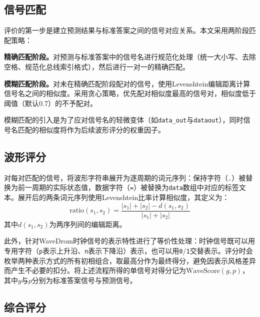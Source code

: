 \subsection{信号匹配}

评价的第一步是建立预测结果与标准答案之间的信号对应关系。本文采用两阶段匹配策略：

\textbf{精确匹配阶段。}对预测与标准答案中的信号名进行规范化处理（统一大小写、去除空格、规范化总线索引格式），然后进行一对一的精确匹配。

\textbf{模糊匹配阶段。}对未在精确匹配阶段配对的信号，使用Levenshtein编辑距离计算信号名之间的相似度。采用贪心策略，优先配对相似度最高的信号对，相似度低于阈值（默认0.7）的不予配对。

模糊匹配的引入是为了应对信号名的轻微变体（如\texttt{data\_out}与\texttt{dataout}），同时信号名匹配的相似度将作为后续波形评分的权重因子。

\subsection{波形评分}

对每对匹配的信号，将波形字符串展开为逐周期的词元序列：保持字符（\texttt{.}）被替换为前一周期的实际状态值，数据字符（\texttt{=}）被替换为\texttt{data}数组中对应的标签文本。展开后的两条词元序列使用Levenshtein比率计算相似度，其定义为：
\begin{equation}
  \text{ratio}(s_1, s_2) = \frac{|s_1| + |s_2| - d(s_1, s_2)}{|s_1| + |s_2|}
\end{equation}
其中$d(s_1, s_2)$为两序列间的编辑距离。


此外，针对WaveDrom时钟信号的表示特性进行了等价性处理：时钟信号既可以用专用字符（\texttt{p}表示上升沿、\texttt{n}表示下降沿）表示，也可以用\texttt{0}/\texttt{1}交替表示。评分时会枚举两种表示方式的所有初相组合，取最高分作为最终得分，避免因表示风格差异而产生不必要的扣分。将上述流程所得的单信号对得分记为$\text{WaveScore}(g, p)$，其中$g$与$p$分别为标准答案信号与预测信号。

\subsection{综合评分}

